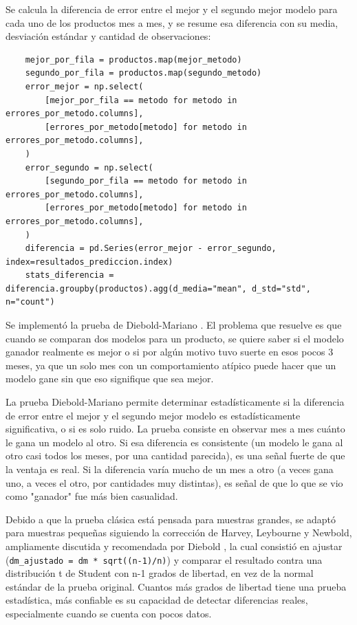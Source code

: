 Se calcula la diferencia de error entre el mejor y el segundo mejor modelo para cada uno de los productos mes a mes, y se resume esa diferencia con su media, desviación estándar y cantidad de observaciones:

\label{lst:campeon_diferencias}
\begin{verbatim}
    mejor_por_fila = productos.map(mejor_metodo)
    segundo_por_fila = productos.map(segundo_metodo)
    error_mejor = np.select(
        [mejor_por_fila == metodo for metodo in errores_por_metodo.columns],
        [errores_por_metodo[metodo] for metodo in errores_por_metodo.columns],
    )
    error_segundo = np.select(
        [segundo_por_fila == metodo for metodo in errores_por_metodo.columns],
        [errores_por_metodo[metodo] for metodo in errores_por_metodo.columns],
    )
    diferencia = pd.Series(error_mejor - error_segundo, index=resultados_prediccion.index)
    stats_diferencia = diferencia.groupby(productos).agg(d_media="mean", d_std="std", n="count")
\end{verbatim}

Se implementó la prueba de Diebold-Mariano \cite{diebold_mariano}. El problema que resuelve es que cuando se comparan dos modelos para un producto, se quiere saber si el modelo ganador realmente es mejor o si por algún motivo tuvo suerte en esos pocos 3 meses, ya que un solo mes con un comportamiento atípico puede hacer que un modelo gane sin que eso signifique que sea mejor.

La prueba Diebold-Mariano permite determinar estadísticamente si la diferencia de error entre el mejor y el segundo mejor modelo es estadísticamente significativa, o si es solo ruido. La prueba consiste en observar mes a mes cuánto le gana un modelo al otro. Si esa diferencia es consistente (un modelo le gana al otro casi todos los meses, por una cantidad parecida), es una señal fuerte de que la ventaja es real. Si la diferencia varía mucho de un mes a otro (a veces gana uno, a veces el otro, por cantidades muy distintas), es señal de que lo que se vio como "ganador" fue más bien casualidad.

Debido a que la prueba clásica está pensada para muestras grandes, se adaptó para muestras pequeñas siguiendo la corrección de Harvey, Leybourne y Newbold, ampliamente discutida y recomendada por Diebold \cite{diebold2015comparing}, la cual consistió en ajustar (\texttt{dm\_ajustado = dm * sqrt((n-1)/n)}) y comparar el resultado contra una distribución t de Student con n-1 grados de libertad, en vez de la normal estándar de la prueba original. Cuantos más grados de libertad tiene una prueba estadística, más confiable es su capacidad de detectar diferencias reales, especialmente cuando se cuenta con pocos datos.

